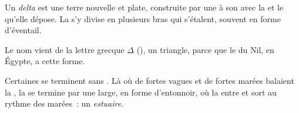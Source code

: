 \begin{definition}[Delta]\label{def:g5:water-shapes-the-land:delta}
Un \emph{delta} est une terre nouvelle et plate, construite par
une  à son  avec la  et le  qu'elle dépose. La
 s'y divise en plusieurs bras qui s'étalent, souvent en forme
d'éventail.
\end{definition}

Le nom vient de la lettre grecque $\Delta$ (), un triangle, parce que
le  du Nil, en Égypte, a cette forme.

Certaines  se terminent sans . Là où de fortes vagues et de
fortes marées balaient la , la  se termine par une 
large, en forme d'entonnoir, où la  entre et sort au rythme des
marées~: un \emph{estuaire}.

